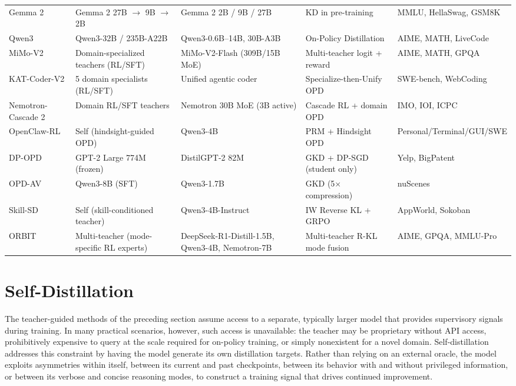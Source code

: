 \documentclass{article} %
\begin{document}
\begin{table}[t]
{\begin{tabular}{@{}lllll@{}}
        Gemma 2 \citep{2408.00118} & Gemma 2 27B $\to$ 9B $\to$ 2B & Gemma 2 2B / 9B / 27B & KD in pre-training & MMLU, HellaSwag, GSM8K \\
        Qwen3 \citep{2505.09388} & Qwen3-32B / 235B-A22B & Qwen3-0.6B--14B, 30B-A3B & On-Policy Distillation & AIME, MATH, LiveCode \\
        MiMo-V2 \citep{2601.02780} & Domain-specialized teachers (RL/SFT) & MiMo-V2-Flash (309B/15B MoE) & Multi-teacher logit + reward & AIME, MATH, GPQA \\
        KAT-Coder-V2 \citep{li2026katcoderv2} & 5 domain specialists (RL/SFT) & Unified agentic coder & Specialize-then-Unify OPD & SWE-bench, WebCoding \\
        Nemotron-Cascade 2 \citep{2603.19220} & Domain RL/SFT teachers & Nemotron 30B MoE (3B active) & Cascade RL + domain OPD & IMO, IOI, ICPC \\
        OpenClaw-RL \citep{wang2026openclawrl} & Self (hindsight-guided OPD) & Qwen3-4B & PRM + Hindsight OPD & Personal/Terminal/GUI/SWE \\
        DP-OPD \citep{khadem2026dpopd} & GPT-2 Large 774M (frozen) & DistilGPT-2 82M & GKD + DP-SGD (student only) & Yelp, BigPatent \\
        OPD-AV \citep{afsharrad2026onpolicy} & Qwen3-8B (SFT) & Qwen3-1.7B & GKD (5$\times$ compression) & nuScenes \\
        Skill-SD \citep{wang2026skillsd} & Self (skill-conditioned teacher) & Qwen3-4B-Instruct & IW Reverse KL + GRPO & AppWorld, Sokoban \\
        ORBIT \citep{liang2026orbit} & Multi-teacher (mode-specific RL experts) & DeepSeek-R1-Distill-1.5B, Qwen3-4B, Nemotron-7B & Multi-teacher R-KL mode fusion & AIME, GPQA, MMLU-Pro \\
                \bottomrule
    \end{tabular}
    }
\end{table}




\section{Self-Distillation}
\label{sec:self_distill}

The teacher-guided methods of the preceding section assume access to a separate, typically larger model that provides supervisory signals during training. In many practical scenarios, however, such access is unavailable: the teacher may be proprietary without API access, prohibitively expensive to query at the scale required for on-policy training, or simply nonexistent for a novel domain. Self-distillation addresses this constraint by having the model generate its own distillation targets. Rather than relying on an external oracle, the model exploits asymmetries within itself, between its current and past checkpoints, between its behavior with and without privileged information, or between its verbose and concise reasoning modes, to construct a training signal that drives continued improvement.
\end{document}
